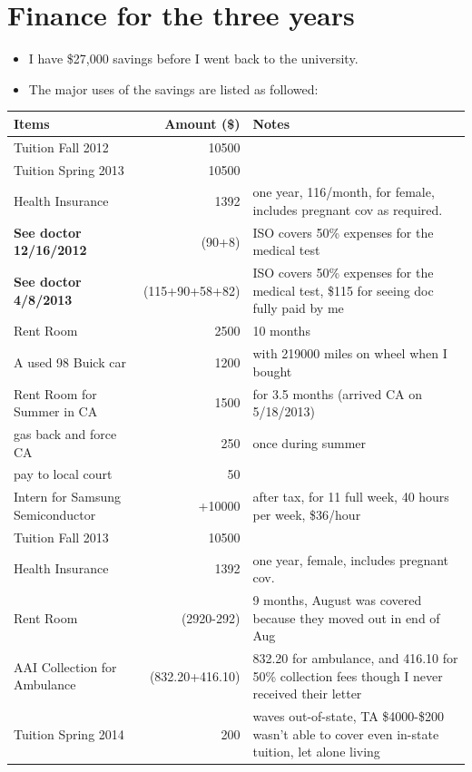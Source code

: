 \documentclass[9pt,b5paper]{article}
\begin{document}
\section{Finance for the three years}
\label{sec-8}
\begin{itemize}
\item I have \$27,000 savings before I went back to the university.
\item The major uses of the savings are listed as followed:
\end{itemize}
\begin{center}
\begin{tabular}{lrl}
\hline
Items & Amount (\$) & Notes\\
\hline
Tuition Fall 2012 & 10500 & \\
Tuition Spring 2013 & 10500 & \\
Health Insurance & 1392 & one year, 116/month, for female, includes pregnant cov as required.\\
\textbf{See doctor 12/16/2012} & (90+8) & ISO covers 50\% expenses for the medical test\\
\textbf{See doctor 4/8/2013} & (115+90+58+82) & ISO covers 50\% expenses for the medical test, \$115 for seeing doc fully paid by me\\
Rent Room & 2500 & 10 months\\
A used 98 Buick car & 1200 & with 219000 miles on wheel when I bought\\
Rent Room for Summer in CA & 1500 & for 3.5 months (arrived CA on 5/18/2013)\\
gas back and force CA & 250 & once during summer\\
pay to local court & 50 & \\
\hline
Intern for Samsung Semiconductor & +10000 & after tax, for 11 full week, 40 hours per week, \$36/hour\\
\hline
Tuition Fall 2013 & 10500 & \\
Health Insurance & 1392 & one year, female, includes pregnant cov.\\
Rent Room & (2920-292) & 9 months, August was covered because they moved out in end of Aug\\
AAI Collection for Ambulance & (832.20+416.10) & 832.20 for ambulance, and 416.10 for 50\% collection fees though I never received their letter\\
Tuition Spring 2014 & 200 & waves out-of-state, TA \$4000-\$200 wasn't able to cover even in-state tuition, let alone living\\

\end{tabular}
\end{center}
\end{document}
